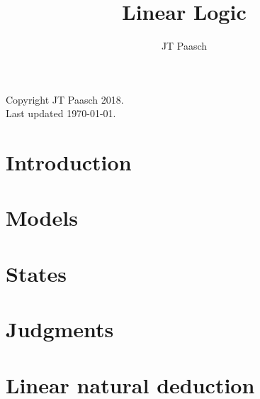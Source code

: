 \documentclass{book}  %
\theoremstyle{definition}
\theoremstyle{plain}
\theoremstyle{remark}
\numberwithin{section}{chapter}
\numberwithin{equation}{chapter}
\begin{document}
\frontmatter 

\title{Linear Logic}
\author{JT Paasch}
\date{}

\maketitle
\newpage

\thispagestyle{empty}
\mbox{}\vfill

\begin{center}
Copyright JT Paasch 2018. \\
Last updated \today.
\end{center}

\tableofcontents

\mainmatter

\part{Introduction}






\part{Models}





\part{States}







\part{Judgments}





\part{Linear natural deduction}
\end{document}

